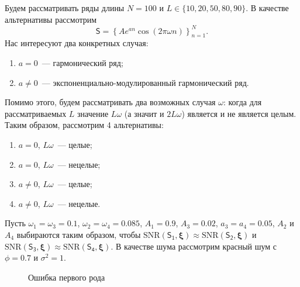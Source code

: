 \documentclass[specialist,
substylefile = spbu_report.rtx,
subf,href,colorlinks=true, 12pt]{disser}
\theoremstyle{definition}
\begin{document}
Будем рассматривать ряды длины $N=100$ и $L\in\{10,20,50,80,90\}$. В качестве альтернативы рассмотрим
\[
	\mathsf{S}=\left\{Ae^{a n}\cos(2\pi\omega n)\right\}_{n=1}^N.
\]
Нас интересуют два конкретных случая:
\begin{enumerate}
	\item $a=0$~--- гармонический ряд;
	\item $a\ne0$~--- экспоненциально-модулированный гармонический ряд.
\end{enumerate}

Помимо этого, будем рассматривать два возможных случая $\omega$: когда для рассматриваемых $L$ значение $L\omega$ (а значит и $2L\omega$) является и не является целым. Таким образом, рассмотрим 4 альтернативы:
\begin{enumerate}
	\item $a=0$, $L\omega$~--- целые;
	\item $a=0$, $L\omega$~--- нецелые;
	\item $a\ne0$, $L\omega$~--- целые;
	\item  $a\ne0$, $L\omega$~--- нецелые.
\end{enumerate}

Пусть $\omega_1=\omega_3=0.1$, $\omega_2=\omega_4=0.085$, $A_1=0.9$, $A_3=0.02$, $a_3=a_4=0.05$, $A_2$ и $A_4$ выбираются таким образом, чтобы $\mathrm{SNR}(\mathsf{S_1}, \bm\xi)\approx\mathrm{SNR}(\mathsf{S_2}, \bm\xi)$ и $\mathrm{SNR}(\mathsf{S_3}, \bm\xi)\approx\mathrm{SNR}(\mathsf{S_4}, \bm\xi)$. В качестве шума рассмотрим красный шум с $\phi=0.7$ и $\sigma^2=1$.

\begin{figure}[h!]
	\centering
	\hfill
	\par
	\caption{Ошибка первого рода}
	\label{fig:mcssa_comp_alphaI}
\end{figure}
\end{document}
